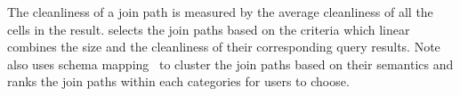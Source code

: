 {The cleanliness of a join path is measured by the average cleanliness of all the cells in the result. \dcv selects the join paths based on the criteria which linear combines the size and the cleanliness of their corresponding query results. Note \dcv also uses schema mapping~\cite{DBLP:conf/cidr/StonebrakerBIBCZPX13} to cluster the join paths based on their semantics and ranks the join paths within each categories for users to choose.}







